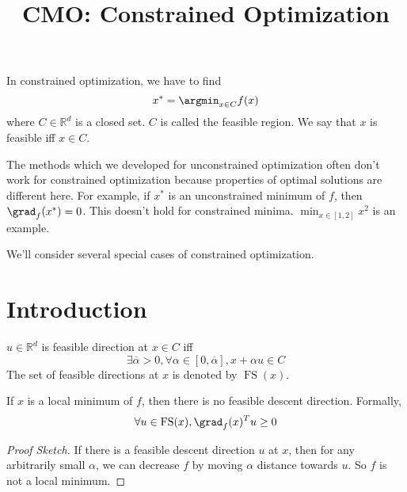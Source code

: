


\title{CMO: Constrained Optimization}



\maketitle
\initMinimal{}

In constrained optimization, we have to find
\[ x^* = \argmin_{x \in C} f(x) \]
where $C \in \mathbb{R}^d$ is a closed set.
$C$ is called the feasible region.
We say that $x$ is feasible iff $x \in C$.

The methods which we developed for unconstrained optimization
often don't work for constrained optimization because properties
of optimal solutions are different here.
For example, if $x^*$ is an unconstrained minimum of $f$,
then $\grad_f(x^*) = 0$. This doesn't hold for constrained minima.
$\min_{x \in [1, 2]} x^2$ is an example.

We'll consider several special cases of constrained optimization.

\newcommand{\FS}{\operatorname{FS}}
\newcommand{\LFS}{\operatorname{LFS}}
\newcommand{\DS}{\operatorname{DS}}

\tableofcontents

\section{Introduction}

\begin{definition}
$u \in \mathbb{R}^d$ is feasible direction at $x \in C$ iff
\[ \exists \overline{\alpha} > 0, \forall \alpha \in [0, \overline{\alpha}], x + \alpha u \in C \]
The set of feasible directions at $x$ is denoted by $\FS(x)$.
\end{definition}

\begin{theorem} \label{thm:locmin-implies-nofs}
If $x$ is a local minimum of $f$, then there is no feasible descent direction.
Formally,
\[ \forall u \in \FS(x), \grad_f(x)^Tu \ge 0 \]
\end{theorem}
\begin{proof}[Proof Sketch]
If there is a feasible descent direction $u$ at $x$,
then for any arbitrarily small $\alpha$, we can decrease $f$
by moving $\alpha$ distance towards $u$.
So $f$ is not a local minimum.
\end{proof}

